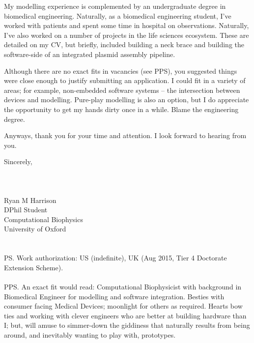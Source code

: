 \documentclass{../res}
\begin{document}
\begin{sloppypar}
\begin{resume}
My modelling experience is complemented by an undergraduate degree in biomedical engineering. Naturally, as a biomedical engineering student, I've worked with patients and spent some time in hospital on observations. Naturally, I've also worked on a number of projects in the life sciences ecosystem. These are detailed on my CV, but briefly, included building a neck brace and building the software-side of an integrated plasmid assembly pipeline.

Although there are no exact fits in vacancies (see PPS), you suggested things were close enough to justify submitting an application. I could fit in a variety of areas; for example, non-embedded software systems -- the intersection between devices and modelling. Pure-play modelling is also an option, but I do appreciate the opportunity to get my hands dirty once in a while. Blame the engineering degree.

Anyways, thank you for your time and attention. I look forward to hearing from you.

\vspace{1\baselineskip}
Sincerely,
\\ \\ \\ \\
Ryan M Harrison \\ 
DPhil Student \\
Computational Biophysics \\
University of Oxford  \\ \\ \\
PS. Work authorization: US (indefinite), UK (Aug 2015, Tier 4 Doctorate Extension Scheme). \\ \\
PPS. An exact fit would read: Computational Biophysicist with background in Biomedical Engineer for modelling and software integration. Besties with consumer facing Medical Devices; moonlight for others as required. Hearts bow ties and working with clever engineers who are better at building hardware than I; but, will amuse to simmer-down the giddiness that naturally results from being around, and inevitably wanting to play with, prototypes.

\end{resume} 
\end{sloppypar}
\end{document}
